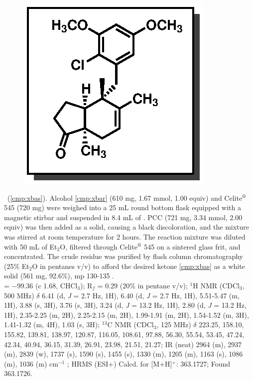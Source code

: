 \begin{figure}
  \vspace{-25pt}
  \begin{center}
    \includegraphics[scale=0.8]{chp_singlecarbon/images/xbas}
  \end{center}
  \vspace{-30pt}
\end{figure}\noindent \textbf{\CMPxbas}\ (\ref{cmp:xbas}). Alcohol \ref{cmp:xbar} (610 mg, 1.67
mmol, 1.00 equiv) and Celite$\textsuperscript{\textregistered}$ 545 (720 mg) were weighed into a 25
mL round bottom flask equipped with a magnetic stirbar and suspended in 8.4
mL of . PCC (721 mg, 3.34 mmol, 2.00 equiv) was then added as a
solid, causing a black discoloration, and the mixture was stirred at room
temperature for 2 hours. The reaction mixture was diluted with 50 mL of Et$_2$O, filtered through
Celite$\textsuperscript{\textregistered}$ 545 on a sintered glass frit, and concentrated. The crude
residue was purified by flash column chromatography (25\% Et$_2$O in pentanes v/v) to afford the
desired ketone \ref{cmp:xbas} as a white solid (561 mg, 92.6\%), mp 130-135 \degc. \\
\rotation = $-$99.36 (c 1.68, CHCl$_3$); R$_f$ = 0.29 (20\%  in pentane v/v); $^1$H NMR (CDCl$_3$, 500
MHz) $\delta$ 6.41 (d, \textit{J} = 2.7 Hz, 1H), 6.40 (d, \textit{J} = 2.7 Hz, 1H), 5.51-5.47 (m, 1H), 3.88 (s, 3H), 3.76
(s, 3H), 3.24 (d, \textit{J} = 13.2 Hz, 1H), 2.80 (d, \textit{J} = 13.2 Hz, 1H), 2.35-2.25 (m, 2H), 2.25-2.15 (m,
2H), 1.99-1.91 (m, 2H), 1.54-1.52 (m, 3H), 1.41-1.32 (m, 4H), 1.03 (s, 3H); $^{13}$C NMR (CDCl$_3$,
125 MHz) $\delta$ 223.25, 158.10, 155.82, 139.81, 138.97, 120.87, 116.05, 108.61, 97.88, 56.30, 55.54,
53.45, 47.24, 42.34, 40.94, 36.15, 31.39, 26.91, 23.98, 21.51, 21.27; IR (neat) 2964 (m), 2937
(m), 2839 (w), 1737 (s), 1590 (s), 1455 (s), 1330 (m), 1205 (m), 1163 (s), 1086 (m), 1036 (m)
cm$^{-1}$ ; HRMS (ESI+) Calcd. for  [M+H]$^+$: 363.1727; Found 363.1726.

